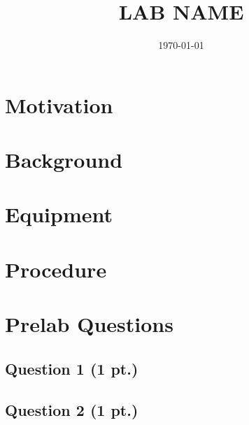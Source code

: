 \documentclass[]{manual}
\title{LAB NAME}
\date{\today}
\begin{document}
    \maketitle
    \thispagestyle{firstpage}


    \section*{Motivation}


    \section*{Background}


    \section*{Equipment}


    \FloatBarrier
    \newpage

    \section*{Procedure}


    \FloatBarrier
    \newpage

    \section*{Prelab Questions}
    \setcounter{subsection}{0}

    \subsection{Question 1 \hfill (1 pt.)}


    \subsection{Question 2 \hfill (1 pt.)}

\end{document}
